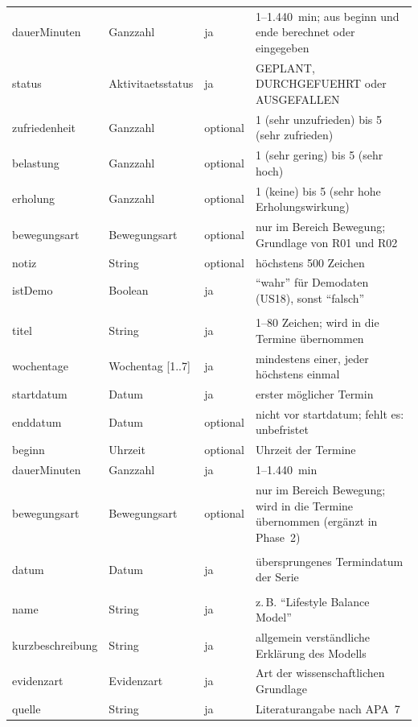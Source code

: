 \begin{longtable}{@{}>{}L{3.8cm}L{2.8cm}L{1.5cm}L{7.1cm}@{}}
  dauerMinuten & Ganzzahl & ja & 1--1.440~min; aus beginn und ende berechnet oder eingegeben \\
  status & Aktivitaets\-status & ja & GEPLANT, DURCHGEFUEHRT oder AUSGEFALLEN \\
  zufriedenheit & Ganzzahl & optional & 1 (sehr unzufrieden) bis 5 (sehr zufrieden) \\
  belastung & Ganzzahl & optional & 1 (sehr gering) bis 5 (sehr hoch) \\
  erholung & Ganzzahl & optional & 1 (keine) bis 5 (sehr hohe Erholungswirkung) \\
  bewegungsart & Bewegungsart & optional & nur im Bereich Bewegung; Grundlage von R01 und R02 \\
  notiz & String & optional & höchstens 500 Zeichen \\
  istDemo & Boolean & ja & \enquote{wahr} für Demodaten (US18), sonst \enquote{falsch} \\
  \midrule
   \\*
  titel & String & ja & 1--80 Zeichen; wird in die Termine übernommen \\
  wochentage & Wochentag [1..7] & ja & mindestens einer, jeder höchstens einmal \\
  startdatum & Datum & ja & erster möglicher Termin \\
  enddatum & Datum & optional & nicht vor startdatum; fehlt es: unbefristet \\
  beginn & Uhrzeit & optional & Uhrzeit der Termine \\
  dauerMinuten & Ganzzahl & ja & 1--1.440~min \\
  bewegungsart & Bewegungsart & optional & nur im Bereich Bewegung; wird in die Termine übernommen (ergänzt in Phase~2) \\
  \midrule
   \\*
  datum & Datum & ja & übersprungenes Termindatum der Serie \\
  \midrule
   \\*
  name & String & ja & z.\,B. \enquote{Lifestyle Balance Model} \\
  kurzbeschreibung & String & ja & allgemein verständliche Erklärung des Modells \\
  evidenzart & Evidenzart & ja & Art der wissenschaftlichen Grundlage \\
  quelle & String & ja & Literaturangabe nach \ac{APA}~7 \\

\end{longtable}
